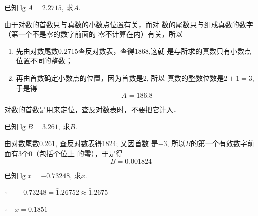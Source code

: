     



\begin{example}
    已知$\lg A=2.2715$, 求$A$.
\end{example}

\begin{solution}
    由于对数的首数只与真数的小数点位置有关，而对
数的尾数只与组成真数的数字（第一个不是零的数字前面的
零不计算在内）有关，所以
\begin{enumerate}
    \item 先由对数尾数0.2715查反对数表，查得1868,这就
    是与所求的真数只有小数点位置不同的整数；
    \item 再由首数确定小数点的位置，因为首数是2, 所以
    真数的整数位数是$2+1=3$, 于是得
    $$A=186.8$$
\end{enumerate}
\end{solution}    

\begin{rmk}
    对数的首数是用来定位，查反对数表时，不要把它计入．
\end{rmk}


\begin{example}
   已知$\lg B=\bar{3}.261$, 求$B$. 
\end{example}

\begin{solution}
由对数尾数0.261, 查反对数表得1824; 又因首数
    是$-3$, 所以$B$的第一个有效数字前面有3个0（包括个位上
    的零），于是得
    \[B=0.001824\]
\end{solution}    

\begin{example}
    已知$\lg x=-0.73248$, 求$x$.
\end{example}

\begin{solution}
$\because\quad -0.73248=\bar{1}.26752\approx \bar{1}.2675$

$\therefore\quad x=0.1851$
\end{solution}  

